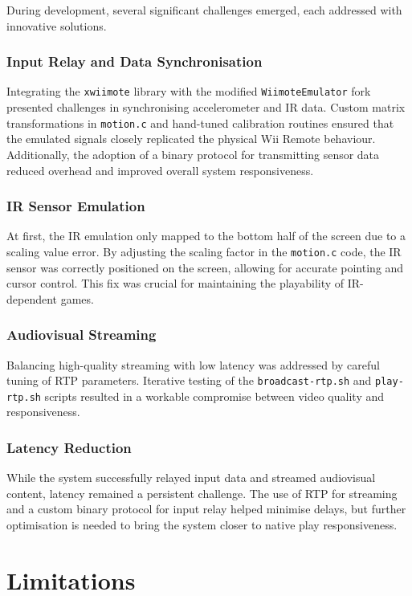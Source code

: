 During development, several significant challenges emerged, each addressed with innovative solutions.

\subsubsection{Input Relay and Data Synchronisation}
Integrating the \texttt{xwiimote} library with the modified \texttt{WiimoteEmulator} fork presented challenges in synchronising accelerometer and IR data. Custom matrix transformations in \texttt{motion.c} and hand-tuned calibration routines ensured that the emulated signals closely replicated the physical Wii Remote behaviour. Additionally, the adoption of a binary protocol for transmitting sensor data reduced overhead and improved overall system responsiveness.

\subsubsection{IR Sensor Emulation}
At first, the IR emulation only mapped to the bottom half of the screen due to a scaling value error. By adjusting the scaling factor in the \texttt{motion.c} code, the IR sensor was correctly positioned on the screen, allowing for accurate pointing and cursor control. This fix was crucial for maintaining the playability of IR-dependent games.

\subsubsection{Audiovisual Streaming}
Balancing high-quality streaming with low latency was addressed by careful tuning of RTP parameters. Iterative testing of the \texttt{broadcast-rtp.sh} and \texttt{play-rtp.sh} scripts resulted in a workable compromise between video quality and responsiveness.

\subsubsection{Latency Reduction}
While the system successfully relayed input data and streamed audiovisual content, latency remained a persistent challenge. The use of RTP for streaming and a custom binary protocol for input relay helped minimise delays, but further optimisation is needed to bring the system closer to native play responsiveness.

\section{Limitations}

